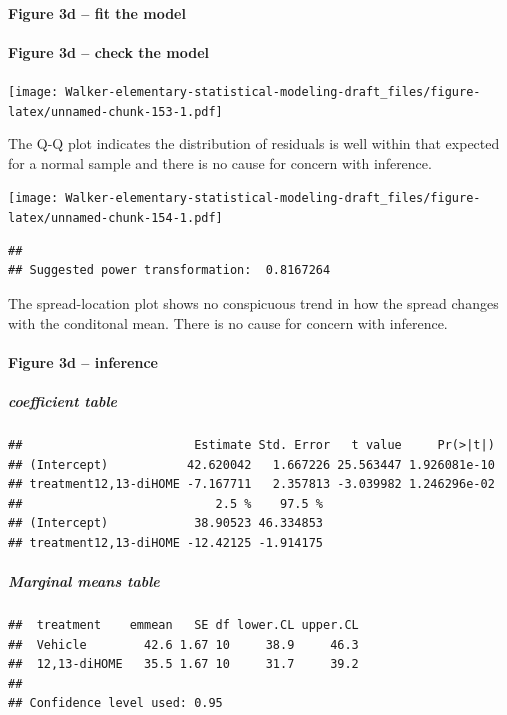 \documentclass[]{book}
\let\oldparagraph\paragraph
\renewcommand{\paragraph}[1]{\oldparagraph{#1}\mbox{}}
\let\oldsubparagraph\subparagraph
\renewcommand{\subparagraph}[1]{\oldsubparagraph{#1}\mbox{}}
\begin{document}
\hypertarget{figure-3d-fit-the-model}{%
\paragraph{Figure 3d -- fit the model}\label{figure-3d-fit-the-model}}

\hypertarget{figure-3d-check-the-model}{%
\paragraph{Figure 3d -- check the model}\label{figure-3d-check-the-model}}

\texttt{[image: Walker-elementary-statistical-modeling-draft\_files/figure-latex/unnamed-chunk-153-1.pdf]}

The Q-Q plot indicates the distribution of residuals is well within that expected for a normal sample and there is no cause for concern with inference.

\texttt{[image: Walker-elementary-statistical-modeling-draft\_files/figure-latex/unnamed-chunk-154-1.pdf]}

\begin{verbatim}
## 
## Suggested power transformation:  0.8167264
\end{verbatim}

The spread-location plot shows no conspicuous trend in how the spread changes with the conditonal mean. There is no cause for concern with inference.

\hypertarget{figure-3d-inference}{%
\paragraph{Figure 3d -- inference}\label{figure-3d-inference}}

\hypertarget{coefficient-table}{%
\subparagraph{coefficient table}\label{coefficient-table}}

\begin{verbatim}
##                        Estimate Std. Error   t value     Pr(>|t|)
## (Intercept)           42.620042   1.667226 25.563447 1.926081e-10
## treatment12,13-diHOME -7.167711   2.357813 -3.039982 1.246296e-02
##                           2.5 %    97.5 %
## (Intercept)            38.90523 46.334853
## treatment12,13-diHOME -12.42125 -1.914175
\end{verbatim}

\hypertarget{marginal-means-table}{%
\subparagraph{Marginal means table}\label{marginal-means-table}}

\begin{verbatim}
##  treatment    emmean   SE df lower.CL upper.CL
##  Vehicle        42.6 1.67 10     38.9     46.3
##  12,13-diHOME   35.5 1.67 10     31.7     39.2
## 
## Confidence level used: 0.95
\end{verbatim}
\end{document}
